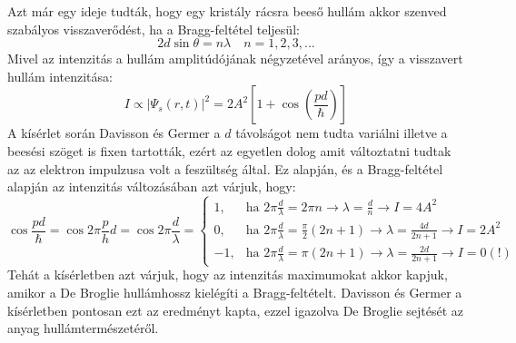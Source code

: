\documentclass[../main.tex]{subfiles}
\begin{document}
Azt már egy ideje tudták, hogy egy kristály rácsra beeső hullám akkor szenved szabályos visszaverődést, ha a Bragg-feltétel teljesül:
\begin{equation}
2d \sin \theta = n \lambda \quad n = 1, 2, 3, ...
\end{equation}
Mivel az intenzitás a hullám amplitúdójának négyzetével arányos, így a visszavert hullám intenzitása:
\begin{equation}
I \propto |\Psi_{s}(r,t)|^2 = 2A^2 \left[1 + \cos\left(\frac{pd}{\hbar}\right)\right]
\end{equation}
A kísérlet során Davisson és Germer a $d$ távolságot nem tudta variálni illetve a beesési szöget is fixen tartották, ezért az egyetlen dolog amit változtatni tudtak az az elektron impulzusa volt a feszültség által.
Ez alapján, és a Bragg-feltétel alapján az intenzitás változásában azt várjuk, hogy:
\begin{equation}
    \cos \frac{pd}{\hbar} = \cos 2\pi \frac{p}{h} d = \cos 2\pi \frac{d}{\lambda} = \begin{cases}
1, & \text{ha } 2\pi \frac{d}{\lambda} = 2\pi n \rightarrow \lambda = \frac{d}{n} \rightarrow I = 4A^2 \\
0, & \text{ha } 2\pi \frac{d}{\lambda} = \frac{\pi}{2} (2n + 1) \rightarrow \lambda = \frac{4d}{2n + 1} \rightarrow I = 2A^2 \\
-1, & \text{ha } 2\pi \frac{d}{\lambda} = \pi (2n + 1) \rightarrow \lambda = \frac{2d}{2n + 1} \rightarrow I = 0 (!)
    \end{cases}
\end{equation}
Tehát a kísérletben azt várjuk, hogy az intenzitás maximumokat akkor kapjuk, amikor a De Broglie hullámhossz kielégíti a Bragg-feltételt. Davisson és Germer a kísérletben
pontosan ezt az eredményt kapta, ezzel igazolva De Broglie sejtését az anyag hullámtermészetéről.
\end{document}
